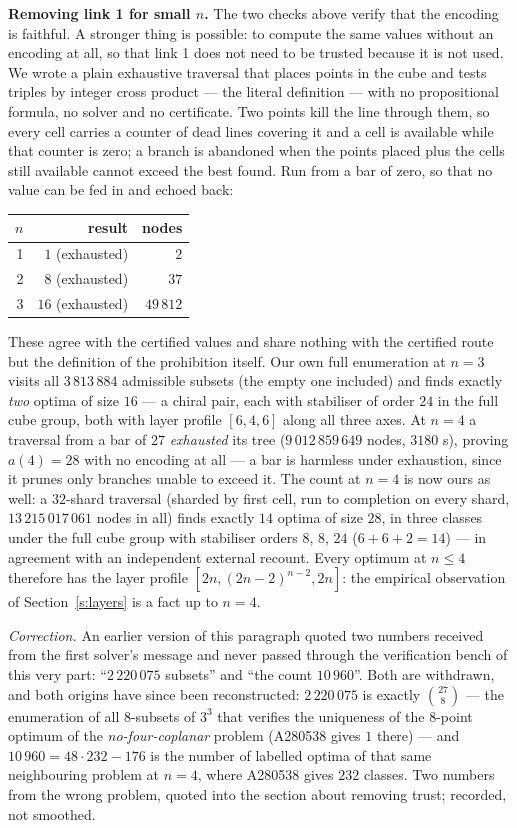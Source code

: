 \documentclass[11pt,a4paper]{article}
\begin{document}
\medskip\noindent\textbf{Removing link 1 for small $n$.}  The two checks above verify that the encoding is
faithful.  A stronger thing is possible: to compute the same values without an encoding at all, so that link 1
does not need to be trusted because it is not used.  We wrote a plain exhaustive traversal that places points
in the cube and tests triples by integer cross product --- the literal definition --- with no propositional
formula, no solver and no certificate.  Two points kill the line through them, so every cell carries a counter
of dead lines covering it and a cell is available while that counter is zero; a branch is abandoned when the
points placed plus the cells still available cannot exceed the best found.  Run from a bar of zero, so that no
value can be fed in and echoed back:
\begin{center}
\begin{tabular}{rrr}
\toprule
$n$ & result & nodes \\
\midrule
1 & $1$ (exhausted) & $2$\\
2 & $8$ (exhausted) & $37$\\
3 & $16$ (exhausted) & $49\,812$\\
\bottomrule
\end{tabular}
\end{center}
These agree with the certified values and share nothing with the certified route but the definition of the
prohibition itself.  Our own full enumeration at $n=3$ visits all $3\,813\,884$ admissible subsets (the empty one
included) and finds exactly \emph{two} optima of size $16$ --- a chiral pair, each with stabiliser of order $24$
in the full cube group, both with layer profile $[6,4,6]$ along all three axes.  At $n=4$ a traversal from a bar
of $27$ \emph{exhausted} its tree ($9\,012\,859\,649$ nodes, $3180$ s), proving $a(4)=28$ with no encoding at
all --- a bar is harmless under exhaustion, since it prunes only branches unable to exceed it.  The count at $n=4$
is now ours as well: a $32$-shard traversal (sharded by first cell, run to completion on every shard,
$13\,215\,017\,061$ nodes in all) finds exactly $14$ optima of size $28$, in three classes under the full cube
group with stabiliser orders $8$, $8$, $24$ ($6+6+2=14$) --- in agreement with an independent external recount.
Every optimum at $n\le4$ therefore has the layer profile $[2n,(2n-2)^{n-2},2n]$: the empirical observation of
Section~\ref{s:layers} is a fact up to $n=4$.

\emph{Correction.}  An earlier version of this paragraph quoted two numbers received from the first solver's
message and never passed through the verification bench of this very part: ``$2\,220\,075$ subsets'' and ``the
count $10\,960$''.  Both are withdrawn, and both origins have since been reconstructed: $2\,220\,075$ is exactly
$\binom{27}{8}$ --- the enumeration of all $8$-subsets of $3^3$ that verifies the uniqueness of the $8$-point
optimum of the \emph{no-four-coplanar} problem (A280538 gives $1$ there) --- and $10\,960=48\cdot232-176$ is
the number of labelled optima of that same neighbouring problem at $n=4$, where A280538 gives $232$ classes.
Two numbers from the wrong problem, quoted into the section about removing trust; recorded, not smoothed.
\end{document}
